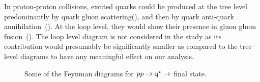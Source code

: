 In proton-proton collisions, excited quarks could be produced at the tree level predominantly by quark gluon scattering(\fig{\ref{fig:qstarS}}), 
and then by quark anti-quark annihilation~(\fig{\ref{fig:qstarT}}). At the loop level, they would show their presence in gluon gluon 
fusion~(\fig{\ref{fig:qstarBox}}). %
The loop level diagram is not considered in the study as its contribution would presumably be significantly smaller as compared to the tree level diagrams to have any meaningful effect on our analysis.
\begin{figure}[!h]
\centering
 \caption{Some of the Feynman diagrams for $pp\rightarrow\mathrm{q^\star}\rightarrow$ \gamjet final state.}
\label{fig:qstarSig}
\end{figure}
